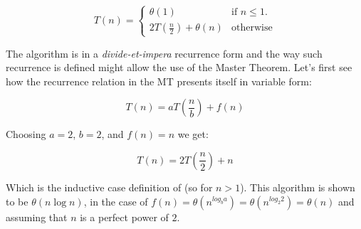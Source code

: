 \documentclass[12pt]{article}
\begin{document}
\begin{equation}
  T(n) =\begin{cases}
    \theta(1) & \text{if $n \leq 1$}.\\
    2T\left( \frac{n}{2} \right) + \theta(n) & \text{otherwise}
  \end{cases}
\end{equation}

The algorithm is in a \textit{divide-et-impera} recurrence form and the way such recurrence is defined might 
allow the use of the Master Theorem. Let's first see how the recurrence relation in the MT presents itself in variable form: 

\begin{equation}
	T(n) = a T\left( \frac{n}{b} \right) + f(n)
\end{equation}

Choosing $a = 2$, $b = 2$, and $f(n) = n$ we get:

\begin{equation}
	T(n) = 2 T\left( \frac{n}{2} \right) + n
\end{equation}

Which is the inductive case definition of  (so for $n > 1$). This algorithm is shown to be 
$\theta(n \log{n})$, in the case of $f(n) = \theta(n^{log_b{a}}) = \theta(n^{log_2{2}}) = \theta(n)$ and assuming that $n$ is 
a perfect power of $2$.
                                                                                                                                                                                                                                                                     
\end{document}
